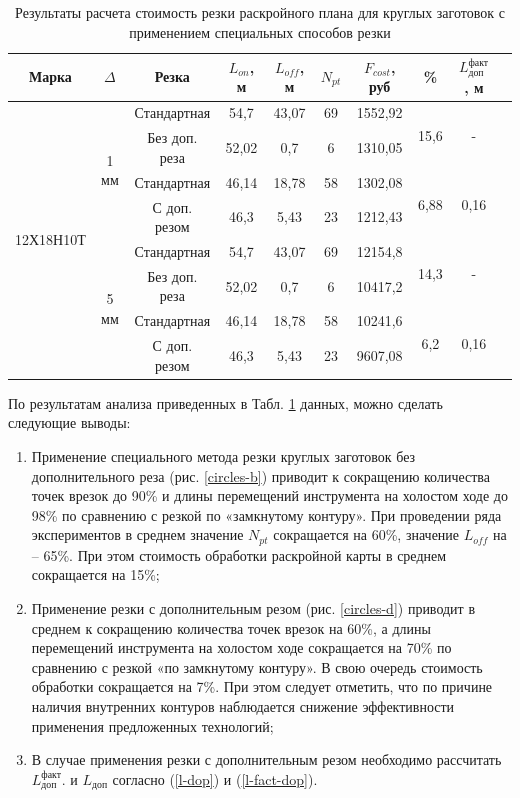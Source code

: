 \documentclass{article}
\begin{document}
\begin{table}
  \begin{tabular}{cccccccccc}
    Марка & $\Delta$ & Резка & $L_{on}$, м & $L_{off}$, м & $N_{pt}$ & $F_{cost}$, руб & \% & $L_\text{доп}^\text{факт}$, м \\
    \hline
    \multirow{8}{*}{12Х18Н10Т} & \multirow{4}{*}{1 мм} & Стандартная & 54,7 &	43,07	& 69 & 1552,92 & \multirow{2}{*}{15,6} &	\multirow{2}{*}{-} \\
    & & Без доп. реза & 52,02 &	0,7 & 6 & 1310,05 \\
    & & Стандартная   & 46,14 & 18,78 & 58 & 1302,08 & \multirow{2}{*}{6,88} & \multirow{2}{*}{0,16} \\
    & & С доп. резом  & 46,3  & 5,43  & 23 & 1212,43 \\
    & \multirow{4}{*}{5 мм} & Стандартная & 54,7 &	43,07	& 69 & 12154,8 & \multirow{2}{*}{14,3} &	\multirow{2}{*}{-} \\
    & & Без доп. реза & 52,02 &	0,7 & 6 & 10417,2 \\
    & & Стандартная   & 46,14 & 18,78 & 58 & 10241,6 & \multirow{2}{*}{6,2} & \multirow{2}{*}{0,16} \\
    & & С доп. резом  & 46,3  & 5,43  & 23 & 9607,08 \\
  \end{tabular}
  \label{circles}
  \caption{Результаты расчета стоимость резки раскройного плана для круглых заготовок с применением специальных способов резки}
\end{table}

По результатам анализа приведенных в Табл. \ref{circles}
данных, можно сделать следующие выводы:

\begin{enumerate}
\item Применение специального метода резки круглых заготовок
без дополнительного реза (рис. \ref{circles-b})
приводит к сокращению количества точек врезок до 90\%
 и длины перемещений инструмента на холостом ходе до 98\%
 по сравнению с резкой по «замкнутому контуру».
 При проведении ряда экспериментов в среднем значение $N_{pt}$
 сокращается на 60\%, значение $L_{off}$ на – 65\%.
 При этом стоимость обработки раскройной карты в среднем сокращается на 15\%;

\item Применение резки с дополнительным резом (рис. \ref{circles-d})
приводит в среднем к сокращению количества точек врезок на 60\%,
а длины перемещений инструмента на холостом ходе сокращается на 70\%
по сравнению с резкой «по замкнутому контуру».
В свою очередь стоимость обработки сокращается на 7\%.
При этом следует отметить,
что по причине наличия внутренних контуров
наблюдается снижение эффективности применения
предложенных технологий;

\item В случае применения резки с дополнительным резом необходимо рассчитать
$L_\text{доп}^\text{факт}$.
и
$L_\text{доп}$
согласно (\ref{l-dop}) и (\ref{l-fact-dop}).
\end{enumerate}
\end{document}
